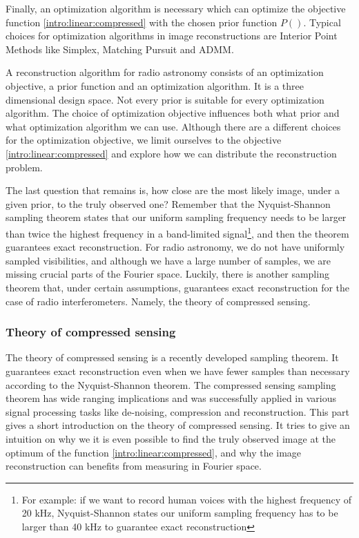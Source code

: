 Finally, an optimization algorithm is necessary which can optimize the objective function \eqref{intro:linear:compressed} with the chosen prior function $P()$. Typical choices for optimization algorithms in image reconstructions are Interior Point Methods like Simplex, Matching Pursuit \cite{hogbom1974aperture} and ADMM\cite{carrillo2014purify}. 

A reconstruction algorithm for radio astronomy consists of an optimization objective, a prior function and an optimization algorithm. It is a three dimensional design space. Not every prior is suitable for every optimization algorithm. The choice of optimization objective influences both what prior and what optimization algorithm we can use. Although there are a different choices for the optimization objective, we limit ourselves to the objective \eqref{intro:linear:compressed} and explore how we can distribute the reconstruction problem.

The last question that remains is, how close are the most likely image, under a given prior, to the truly observed one? Remember that the Nyquist-Shannon sampling theorem states that our uniform sampling frequency needs to be larger than twice the highest frequency in a band-limited signal\footnote{For example: if we want to record human voices with the highest frequency of 20 kHz, Nyquist-Shannon states our uniform sampling frequency has to be larger than 40 kHz to guarantee exact reconstruction}, and then the theorem guarantees exact reconstruction. For radio astronomy, we do not have uniformly sampled visibilities, and although we have a large number of samples, we are missing crucial parts of the Fourier space. Luckily, there is another sampling theorem that, under certain assumptions, guarantees exact reconstruction for the case of radio interferometers. Namely, the theory of compressed sensing.

\subsubsection{Theory of compressed sensing}
The theory of compressed sensing\cite{candes2006robust,donoho2006compressed} is a recently developed sampling theorem. It guarantees exact reconstruction even when we have fewer samples than necessary according to the Nyquist-Shannon theorem. The compressed sensing sampling theorem has wide ranging implications and was successfully applied in various signal processing tasks like de-noising\cite{metzler2016denoising}, compression\cite{mamaghanian2011compressed} and reconstruction\cite{wiaux2009compressed}.
This part gives a short introduction on the theory of compressed sensing. It tries to give an intuition on why we it is even possible to find the truly observed image at the optimum of the function \eqref{intro:linear:compressed}, and why the image reconstruction can benefits from measuring in Fourier space.

